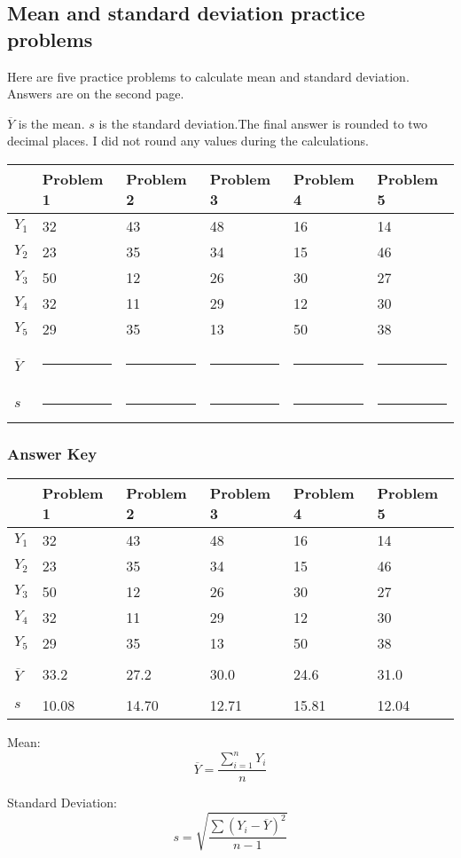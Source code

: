 \documentclass[12pt]{exam}
\begin{document}
\subsection*{Mean and standard deviation practice problems}

Here are five practice problems to calculate mean and standard deviation.  Answers are on the second page.

$\overline{Y}$ is the mean. $s$ is the standard deviation.The final answer is rounded to two decimal places. I did not round any values during the calculations.


\begin{tabular}[l]{@{}R{0.5in}R{0.75in}R{0.75in}R{0.75in}R{0.75in}R{0.75in}@{}}	
\toprule
	& Problem 1	& Problem 2	& Problem 3	& Problem 4	& Problem 5\\
\midrule
$Y_1$	& 32	& 43	& 48	& 16	& 14\\
$Y_2$	& 23	& 35	& 34	& 15	& 46\\
$Y_3$	& 50	& 12	& 26	& 30	& 27\\
$Y_4$	& 32	& 11	& 29	& 12	& 30\\
$Y_5$	& 29	& 35	& 13	& 50	& 38\\
& 	& 	& 	& \\
$\overline{Y}$	& \rule{0.5in}{0.4pt}	& \rule{0.5in}{0.4pt}	& \rule{0.5in}{0.4pt}	& \rule{0.5in}{0.4pt}	& \rule{0.5in}{0.4pt}\\
&	&	&	& \\
$s$	& \rule{0.5in}{0.4pt}	& \rule{0.5in}{0.4pt}	& \rule{0.5in}{0.4pt}	& \rule{0.5in}{0.4pt}	& \rule{0.5in}{0.4pt}\\
\bottomrule
\end{tabular}

\newpage

\subsubsection*{Answer Key}

\begin{tabular}[l]{@{}R{0.5in}R{0.75in}R{0.75in}R{0.75in}R{0.75in}R{0.75in}@{}}	
	\toprule
	& Problem 1	& Problem 2	& Problem 3	& Problem 4	& Problem 5\\
	\midrule
	$Y_1$	& 32	& 43	& 48	& 16	& 14\\
	$Y_2$	& 23	& 35	& 34	& 15	& 46\\
	$Y_3$	& 50	& 12	& 26	& 30	& 27\\
	$Y_4$	& 32	& 11	& 29	& 12	& 30\\
	$Y_5$	& 29	& 35	& 13	& 50	& 38\\
	& 	& 	& 	& \\
	$\overline{Y}$	& 33.2	& 27.2	& 30.0	& 24.6	& 31.0\\
	&	&	&	& \\
	$s$	& 10.08	& 14.70	& 12.71	& 15.81	& 12.04\\
	\bottomrule
\end{tabular}

	\bigskip
	
	\bigskip
	
	Mean:
	\begin{equation*}
	\overline{Y} = \dfrac{\sum\limits^n_{i=1} Y_i}{n}
	\end{equation*}
	
	\bigskip
	
	Standard Deviation:
	\begin{equation*}
	 s = \sqrt{\dfrac{\sum\left(Y_i - \overline{Y}\right)^2}{n-1}}
	\end{equation*}
\end{document}
